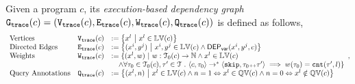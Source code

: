 \begin{defn}
\label{def:trace_graph}
Given a program ${c}$,
its \emph{execution-based dependency graph} 
$\mathtt{{G_{trace}}}({c}) = (\mathtt{{V_{trace}}}({c}), \mathtt{{E_{trace}}}({c}), \mathtt{{W_{trace}}}({c}), \mathtt{{Q_{trace}}}({c}))$ is defined as follows,
{\small
\[
\begin{array}{lll}
  \text{Vertices} &
  \traceV({c}) & := \left\{ 
  x^l
  ~ \middle\vert ~ x^l \in \lvar(c)
  \right\}
  \\
  \text{Directed Edges} &
  \traceE({c}) & := 
  \left\{ 
  (x^i, y^j) 
  ~ \middle\vert ~
  x^i, y^j \in \lvar(c) \land \vardep(x^i, y^j, c) 
  \right\}
  \\
  \text{Weights} &
  \traceW({c}) & := 
  \{ 
  (x^l, w) 
  ~ \vert ~ 
  w : \mathcal{T}_0(c) \to \mathbb{N}
  \land
  x^l \in \lvar(c) 
  \\ & &
  \quad \land
  \forall \trace_0 \in \mathcal{T}_0(c), \trace' \in \mathcal{T} \st \config{{c}, \trace_0} \to^{*} \config{\eskip, \trace_0\tracecat\trace'} 
  \implies w(\trace_0) = \vcounter(\trace', l) \}
  \\
  \text{Query Annotations} &
  \traceF({c}) & := 
\left\{(x^l, n)  
~ \middle\vert ~
 x^l \in \lvar(c) \land
n = 1 \Leftrightarrow x^l \in \qvar(c) \land n = 0 \Leftrightarrow  x^l \notin \qvar(c)
\right\}
\end{array},
\]
}
\end{defn}


